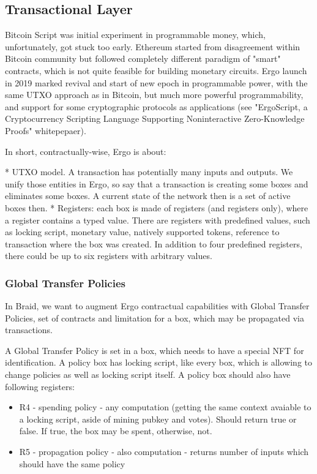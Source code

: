 \documentclass{llncs}   %
\begin{document}
\subsection{Transactional Layer}

Bitcoin Script was initial experiment in programmable money, which, unfortunately, got stuck too early. Ethereum started from disagreement
within Bitcoin community but followed completely different paradigm of "smart" contracts, which is not quite feasible for building monetary circuits. Ergo launch in 2019 marked revival and start of new epoch in programmable power, with the same UTXO approach as in Bitcoin, but much more powerful programmability, and support for some cryptographic protocols as applications (see "ErgoScript, a Cryptocurrency Scripting Language Supporting Noninteractive Zero-Knowledge Proofs" whitepepaer).

In short, contractually-wise, Ergo is about:

* UTXO model. A transaction has potentially many inputs and outputs. We unify those entities in Ergo, so say that a transaction is creating some boxes and eliminates some boxes. A current state of the network then is a set of active boxes then. 
* Registers: each box is made of registers (and registers only), where a register contains a typed value. There are registers with predefined values, such as locking script, monetary value, natively supported tokens, reference to transaction where the box was created. In addition to four predefined registers, there could be up to six registers with arbitrary values.


\subsubsection{Global Transfer Policies}

In Braid, we want to augment Ergo contractual capabilities with Global Transfer Policies, set of contracts and limitation for a box, which may be propagated via transactions.

A Global Transfer Policy is set in a box, which needs to have a special NFT for identification. A policy box has locking script, like every box, which is allowing to change policies as well as locking script itself. A policy box should also have following registers:

\begin{itemize} 
 \item R4 - spending policy - any computation (getting the same context avaiable to a locking script, aside of mining pubkey and votes). Should return true or false. If true, the box may be spent, otherwise, not. 
 \item R5 - propagation policy - also computation - returns number of inputs which should have the same policy
\end{itemize}
\end{document}
